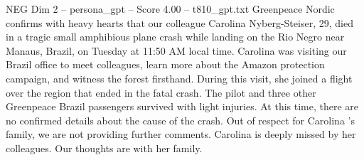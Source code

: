 \begin{textsample}{NEG Dim 2 – persona\_gpt – Score 4.00 – t810\_gpt.txt}  \label{ex:f2_neg_045}
Greenpeace Nordic confirms with heavy hearts that our colleague Carolina Nyberg-Steiser, 29, died in a tragic small amphibious plane crash while landing on the Rio Negro near Manaus, Brazil, on Tuesday at 11:50 AM local time.
Carolina was visiting our Brazil office to meet colleagues, learn more about the Amazon protection campaign, and witness the forest firsthand.
During this visit, she joined a flight over the region that ended in the fatal crash.
The pilot and three other Greenpeace Brazil passengers survived with light injuries.
At this time, there are no confirmed details about the cause of the crash.
Out of respect for Carolina ’s family, we are not providing further comments.
Carolina is deeply missed by her colleagues.
Our thoughts are with her family.

\end{textsample}
